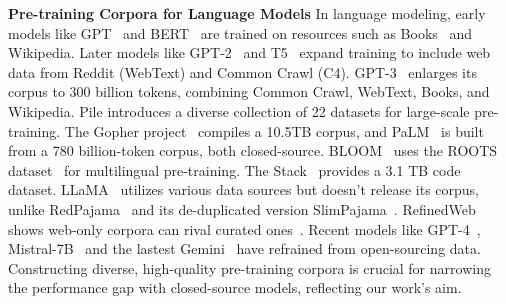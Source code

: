 \textbf{Pre-training Corpora for Language Models} \quad In language modeling, early models like GPT~\citep{radford2018improving} and BERT~\citep{devlin-etal-2019-bert} are trained on resources such as Books~\citep{DBLP:conf/iccv/ZhuKZSUTF15-Books} and Wikipedia. Later models like GPT-2~\citep{radford2019gpt-2} and T5~\citep{DBLP:journals/jmlr/RaffelSRLNMZLL20-T5} expand training to include web data from Reddit (WebText) and Common Crawl (C4). GPT-3~\citep{DBLP:conf/nips/BrownMRSKDNSSAA20-gpt-3} enlarges its corpus to 300 billion tokens, combining Common Crawl, WebText, Books, and Wikipedia. Pile \citep{DBLP:journals/corr/abs-2101-00027-pile} introduces a diverse collection of 22 datasets for large-scale pre-training. The Gopher project~\citep{DBLP:journals/corr/abs-2112-11446-gopher} compiles a 10.5TB corpus, and PaLM~\citep{DBLP:journals/jmlr/ChowdheryNDBMRBCSGSSTMRBTSPRDHPBAI23-palm} is built from a 780 billion-token corpus, both closed-source. BLOOM~\citep{DBLP:journals/corr/abs-2211-05100-bloom} uses the ROOTS dataset~\citep{DBLP:conf/nips/LaurenconSWAMSW22-roots} for multilingual pre-training. The Stack~\citet{DBLP:journals/corr/abs-2211-15533-stack} provides a 3.1 TB code dataset. LLaMA~\citep{DBLP:journals/corr/abs-2302-13971-llama} utilizes various data sources but doesn't release its corpus, unlike RedPajama~\citep{RedPajama} and its de-duplicated version SlimPajama~\citep{SlimPajama}. RefinedWeb shows web-only corpora can rival curated ones~\citep{DBLP:journals/corr/abs-2306-01116-refinedweb}. Recent models like GPT-4~\citep{DBLP:journals/corr/abs-2303-08774-gpt-4}, Mistral-7B~\citep{DBLP:journals/corr/abs-2310-06825-mistral-7b} and the lastest Gemini~\citep{team2023gemini} have refrained from open-sourcing data. Constructing diverse, high-quality pre-training corpora is crucial for narrowing the performance gap with closed-source models, reflecting our work's aim.

